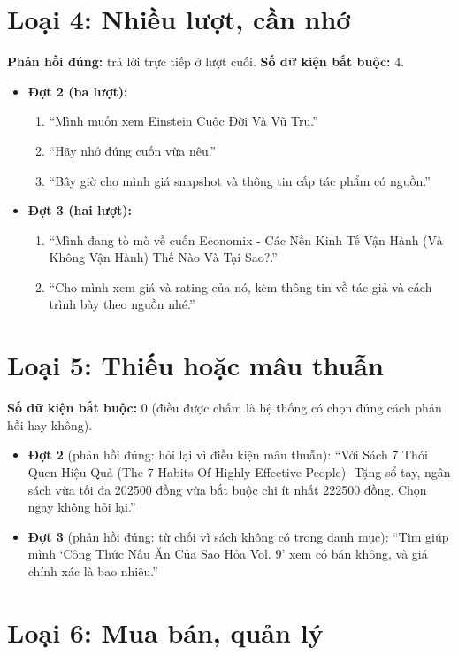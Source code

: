 \section*{Loại 4: Nhiều lượt, cần nhớ}

\textbf{Phản hồi đúng:} trả lời trực tiếp ở lượt cuối. \textbf{Số dữ kiện bắt buộc:} 4.

\begin{itemize}
    \item \textbf{Đợt 2 (ba lượt):}
    \begin{enumerate}
        \item ``Mình muốn xem Einstein Cuộc Đời Và Vũ Trụ.''
        \item ``Hãy nhớ đúng cuốn vừa nêu.''
        \item ``Bây giờ cho mình giá snapshot và thông tin cấp tác phẩm có nguồn.''
    \end{enumerate}
    \item \textbf{Đợt 3 (hai lượt):}
    \begin{enumerate}
        \item ``Mình đang tò mò về cuốn Economix - Các Nền Kinh Tế Vận Hành (Và Không Vận Hành) Thế Nào Và Tại Sao?.''
        \item ``Cho mình xem giá và rating của nó, kèm thông tin về tác giả và cách trình bày theo nguồn nhé.''
    \end{enumerate}
\end{itemize}

\section*{Loại 5: Thiếu hoặc mâu thuẫn}

\textbf{Số dữ kiện bắt buộc:} 0 (điều được chấm là hệ thống có chọn đúng cách phản hồi hay không).

\begin{itemize}
    \item \textbf{Đợt 2} (phản hồi đúng: hỏi lại vì điều kiện mâu thuẫn): ``Với Sách 7 Thói Quen Hiệu Quả (The 7 Habits Of Highly Effective People)- Tặng sổ tay, ngân sách vừa tối đa 202500 đồng vừa bắt buộc chi ít nhất 222500 đồng. Chọn ngay không hỏi lại.''
    \item \textbf{Đợt 3} (phản hồi đúng: từ chối vì sách không có trong danh mục): ``Tìm giúp mình `Công Thức Nấu Ăn Của Sao Hỏa Vol. 9' xem có bán không, và giá chính xác là bao nhiêu.''
\end{itemize}

\section*{Loại 6: Mua bán, quản lý}

